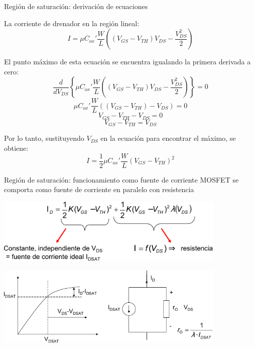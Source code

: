 \documentclass[t,aspectratio=169,10pt]{beamer}
\begin{document}
\begin{frame}{Región de saturación: derivación de ecuaciones}

La corriente de drenador en la región lineal:
\[ I = \mu C_{ox}' \dfrac{W}{L} \left( (V_{GS} - V_{TH})V_{DS} - \dfrac{V_{DS}^2}{2} \right) \]

El punto máximo de esta ecuación se encuentra igualando la primera derivada a cero:
\[ \dfrac{d}{dV_{DS}} \left\{ \mu C_{ox}' \dfrac{W}{L} \left( (V_{GS} - V_{TH})V_{DS} - \dfrac{V_{DS}^2}{2} \right) \right\} = 0 \]
%
\[ \mu C_{ox}' \dfrac{W}{L} \left( (V_{GS} - V_{TH}) - V_{DS} \right) = 0 \]
%
\[ V_{GS} - V_{TH} - V_{DS} = 0 \]
%
\[ V_{GS} - V_{TH} = V_{DS} \]

Por lo tanto, sustituyendo $V_{DS}$ en la ecuación para encontrar el máximo, se obtiene:
\[ \boxed{I = \dfrac{1}{2} \mu C_{ox}' \dfrac{W}{L} (V_{GS} - V_{TH})^2} \]
  
\end{frame}


\begin{frame}{Región de saturación: funcionamiento como fuente de corriente}
MOSFET se comporta como fuente de corriente en paralelo con resistencia

\centering
\includegraphics[width=11cm]{analogico2}

\includegraphics[width=11cm]{analogico3}
\end{frame}
\end{document}
